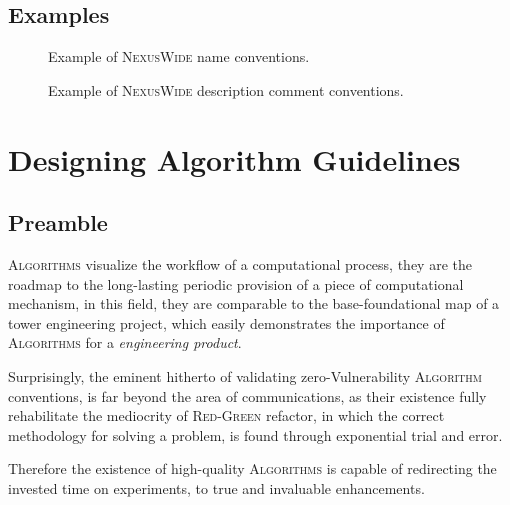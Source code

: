 \documentclass[13pt]{scrarticle}
\newcommand{\header}[1]{ \textsf{#1} \relax{}}
\newcommand{\important}[1]{\textit{#1}}
\newcommand{\name}[1]{{\textsc{#1}}}
\begin{document}
    \newpage
    \subsection{\header{Examples}}

        \begin{figure}[h!]
            \caption{Example of \name{NexusWide} name conventions.}
        \end{figure}

        \begin{figure}[h!]
            \caption{Example of \name{NexusWide} description comment conventions.}
        \end{figure}


     \section{\header{Designing Algorithm Guidelines}}
     \subsection{\header{Preamble}}

     \name{Algorithms} visualize the workflow of a computational process,
     they are the roadmap to the long-lasting periodic
     provision of a piece of computational mechanism,
     in this field, they are comparable to the base-foundational map of a tower engineering project,
     which easily demonstrates the importance of \name{Algorithms} for a \important{engineering product}. \newline

     Surprisingly,
     the eminent hitherto of validating zero-Vulnerability \name{Algorithm} conventions, is far beyond the area of communications,
     as their existence fully rehabilitate the mediocrity of \name{Red-Green} refactor,
     in which the correct methodology for solving a problem,
     is found through exponential trial and error. \newline

     Therefore the existence of high-quality \name{Algorithms} is capable of redirecting the invested time on experiments,
     to true and invaluable enhancements. \newline
\end{document}
